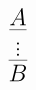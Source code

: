 \documentclass[14pt,border=2pt]{standalone}
\begin{document}
        $$
        \LARGE 

\begin{prooftree}
\hypo{A} \infer1{\vdots} \infer1{B}
\end{prooftree}
        $$
        
\end{document}
